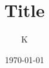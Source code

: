 \documentclass[12pt]{beamer}
\author{K}
\title{Title}
\date{\today}
\begin{document}
\begin{frame}[plain]
    \titlepage
\end{frame}    

\begingroup
    \begin{frame}
        \titlepage
    \end{frame}     
\endgroup   
\end{document}
